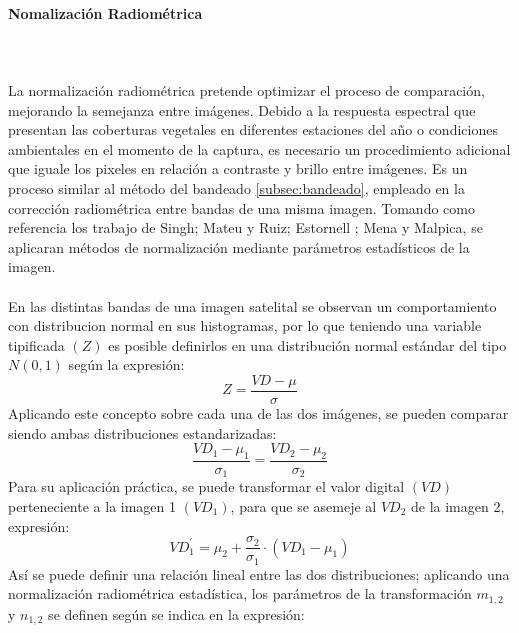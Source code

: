 \paragraph{Nomalizaci\'on Radiom\'etrica}\mbox{}\\\mbox{}\\
La normalizaci\'on radiom\'etrica pretende optimizar el proceso de comparaci\'on, mejorando la semejanza entre im\'agenes. Debido a la respuesta espectral que presentan las coberturas vegetales en diferentes estaciones del a\~{n}o o condiciones ambientales en el momento de la captura, es necesario un procedimiento adicional que iguale los pixeles en relaci\'on a contraste y brillo entre im\'agenes. Es un proceso similar al m\'etodo del bandeado \ref{subsec:bandeado}, empleado en la correcci\'on radiom\'etrica entre bandas de una misma imagen. Tomando como referencia los trabajo de Singh\cite{singh1989review}; Mateu y Ruiz\cite{mateu1999comparacion}; Estornell \cite{estornell2004analisis}; Mena y Malpica\cite{malpica2002fusion}, se aplicaran m\'etodos de normalizaci\'on mediante par\'ametros estad\'isticos de la imagen.\\~\\
En las distintas bandas de una imagen satelital se observan un comportamiento con distribucion normal en sus histogramas, por lo que teniendo una variable tipificada $(Z)$ es posible definirlos en una distribuci\'on normal est\'andar del tipo $ N(0,1) $ seg\'un la expresión:
	\begin{equation}
	Z=\dfrac{VD-\mu}{\sigma}
	\end{equation}
	Aplicando este concepto sobre cada una de las dos im\'agenes, se pueden comparar siendo ambas distribuciones estandarizadas:
	\begin{equation}
	\dfrac{VD_{1}-\mu_{1}}{\sigma_{1}}=\dfrac{VD_{2}-\mu_{2}}{\sigma_{2}}
	\end{equation}
	Para su aplicaci\'on pr\'actica, se puede transformar el valor digital $ (VD) $ perteneciente a la imagen 1 $ (VD_{1}) $, para que se asemeje al $ VD_{2} $ de la imagen 2, expresi\'on:
	\begin{equation}
	VD_{1}^{'}=\mu_{2}+\dfrac{\sigma_{2}}{\sigma_{1}}\cdot(VD_{1}-\mu_{1})
	\end{equation}
	As\'i se puede definir una relaci\'on lineal entre las dos distribuciones; aplicando una normalizaci\'on radiom\'etrica estad\'istica, los par\'ametros de la transformaci\'on $ m_{1,2} $ y $ n_{1,2} $ se definen seg\'un se indica en la expresi\'on:
	

